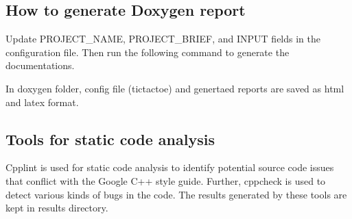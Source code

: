  

\subsection*{How to generate Doxygen report}


\begin{DoxyCode}{0}
\end{DoxyCode}
 Update P\+R\+O\+J\+E\+C\+T\+\_\+\+N\+A\+ME, P\+R\+O\+J\+E\+C\+T\+\_\+\+B\+R\+I\+EF, and I\+N\+P\+UT fields in the configuration file. Then run the following command to generate the documentations. 
\begin{DoxyCode}{0}
\end{DoxyCode}
 In doxygen folder, config file (tictactoe) and genertaed reports are saved as html and latex format.

\subsection*{Tools for static code analysis}

Cpplint is used for static code analysis to identify potential source code issues that conflict with the Google C++ style guide. Further, cppcheck is used to detect various kinds of bugs in the code. The results generated by these tools are kept in results directory. 